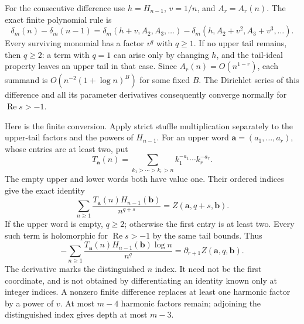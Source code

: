 For the consecutive difference use $h=H_{n-1}$, $v=1/n$, and
$A_r=A_r(n)$.  The exact finite polynomial rule is
\begin{equation}\label{gat:difference}
 \delta_m(n)-\delta_m(n-1)
  =\delta_m(h+v,A_2,A_3,\ldots)
       -\delta_m(h,A_2+v^2,A_3+v^3,\ldots).
\end{equation}
Every surviving monomial has a factor $v^q$ with $q\ge1$.
If no upper tail remains, then $q\ge2$: a term with $q=1$ can
arise only by changing $h$, and the tail-ideal property leaves an
upper tail in that case.  Since $A_r(n)=O(n^{1-r})$, each summand
is $O(n^{-2}(1+\log n)^B)$ for some fixed $B$.
The Dirichlet series of this difference and all its parameter
derivatives consequently converge normally for $\operatorname{Re}s>-1$.

Here is the finite conversion.  Apply strict stuffle multiplication
separately to the upper-tail factors and the powers of $H_{n-1}$.
For an upper word $\mathbf a=(a_1,\ldots,a_r)$, whose entries are
at least two, put
\[
 T_{\mathbf a}(n)=\sum_{k_1>\cdots>k_r>n}
                          k_1^{-a_1}\cdots k_r^{-a_r}.
\]
The empty upper and lower words both have value one.  Their ordered
indices give the exact identity
\begin{equation}\label{gat:concatenation}
 \sum_{n\ge1}\frac{T_{\mathbf a}(n)H_{n-1}(\mathbf b)}{n^{q+s}}
                       =Z(\mathbf a,q+s,\mathbf b).
\end{equation}
If the upper word is empty, $q\ge2$; otherwise the first entry is
at least two.  Every such term is holomorphic for
$\operatorname{Re}s>-1$ by the same tail bounds.  Thus
\begin{equation}\label{gat:mark}
 -\sum_{n\ge1}\frac{T_{\mathbf a}(n)H_{n-1}(\mathbf b)\log n}{n^q}
               =\partial_{r+1}Z(\mathbf a,q,\mathbf b).
\end{equation}
The derivative marks the distinguished $n$ index.  It need not be
the first coordinate, and is not obtained by differentiating an
identity known only at integer indices.  A nonzero finite difference
replaces at least one harmonic factor by a power of $v$.  At most
$m-4$ harmonic factors remain; adjoining the distinguished index
gives depth at most $m-3$.

